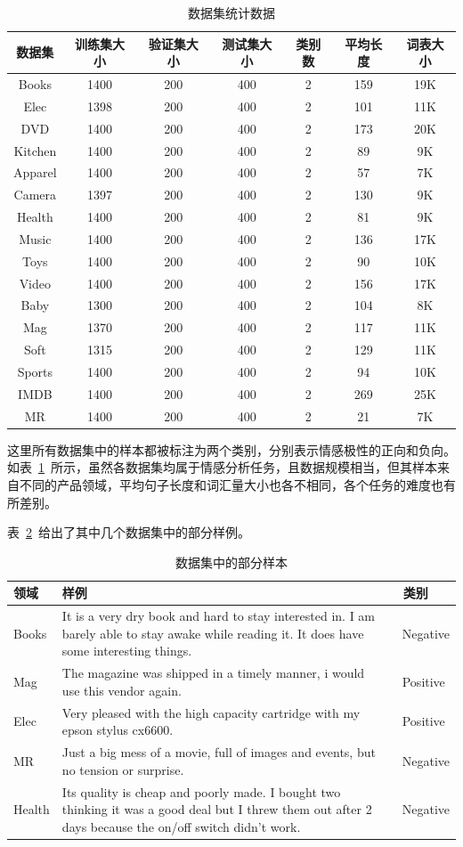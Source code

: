 \begin{table}[htb]
	\centering
	\caption{数据集统计数据}
	\begin{tabular}{ccccccc}
		\toprule[2pt]
		数据集&训练集大小&验证集大小&测试集大小&类别数&平均长度&词表大小\\
		\midrule[1pt]
		Books& 1400& 200& 400& 2& 159& 19K\\
		Elec& 1398& 200& 400& 2& 101& 11K\\
		DVD& 1400& 200& 400& 2& 173& 20K\\
		Kitchen& 1400& 200& 400& 2& 89& 9K\\
		Apparel& 1400& 200& 400& 2& 57& 7K\\
		Camera& 1397& 200& 400& 2& 130& 9K\\
		Health& 1400& 200& 400& 2& 81& 9K\\
		Music& 1400& 200& 400& 2& 136& 17K\\
		Toys& 1400& 200& 400& 2& 90& 10K\\
		Video& 1400& 200& 400& 2& 156& 17K\\
		Baby& 1300& 200& 400& 2& 104& 8K\\
		Mag& 1370& 200& 400& 2& 117& 11K\\
		Soft& 1315& 200& 400& 2& 129& 11K\\
		Sports& 1400& 200& 400& 2& 94& 10K\\
		IMDB& 1400& 200& 400& 2& 269& 25K\\
		MR& 1400& 200& 400& 2& 21& 7K\\
		\bottomrule[2pt]
	\end{tabular}
	\label{tb:dataset}
\end{table}

这里所有数据集中的样本都被标注为两个类别，分别表示情感极性的正向和负向。如表~\ref{tb:dataset}~所示，虽然各数据集均属于情感分析任务，且数据规模相当，但其样本来自不同的产品领域，平均句子长度和词汇量大小也各不相同，各个任务的难度也有所差别。

表~\ref{tb:examples}~给出了其中几个数据集中的部分样例。
\begin{table}[htb]
\centering
\caption{数据集中的部分样本}
\begin{tabular}{m{1.5cm}m{10cm}m{2cm}}
\toprule[2pt]
领域 & 样例 & \ 类别\\
\midrule[1pt]
Books&It is a very dry book and hard to stay interested in. I am barely able to stay awake while reading it. It does have some interesting things.& \ Negative\\
Mag&The magazine was shipped in a timely manner, i would use this vendor again.& \ Positive\\
Elec&Very pleased with the high capacity cartridge with my epson stylus cx6600.& \ Positive\\
MR&Just a big mess of a movie, full of images and events, but no tension or surprise.& \ Negative\\
Health&Its quality is cheap and poorly made. I bought two thinking it was a good deal but I threw them out after 2 days because the on/off switch didn't work.& \ Negative\\
\bottomrule[2pt]
\end{tabular}
\label{tb:examples}
\end{table}

